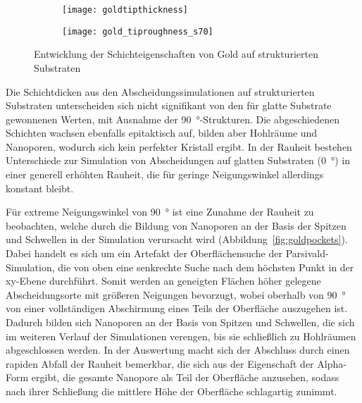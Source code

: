 \begin{figure}
  \captionsetup[subfigure]{singlelinecheck=false}
  \def\subfigwidth{0.49\textwidth}

  \begin{subfigure}[t]{\subfigwidth}
    \texttt{[image: goldtipthickness]}
    \label{fig:goldrough-a}
  \end{subfigure}
  \hfill
  \begin{subfigure}[t]{\subfigwidth}
    \texttt{[image: gold\_tiproughness\_s70]}
    \label{fig:goldrough-b}
  \end{subfigure}

  \caption[Schichteigenschaften von Gold auf strukturierten Substraten]{
    Entwicklung der Schichteigenschaften von Gold auf strukturierten Substraten
  }
  \label{fig:goldrough}

\end{figure}

Die Schichtdicken aus den Abscheidungssimulationen auf strukturierten Substraten unterscheiden sich nicht signifikant von den für glatte Substrate gewonnenen Werten, mit Ausnahme der \SI{90}{\degree}-Strukturen.
Die abgeschiedenen Schichten wachsen ebenfalls epitaktisch auf, bilden aber Hohlräume und Nanoporen, wodurch sich kein perfekter Kristall ergibt.
In der Rauheit bestehen Unterschiede zur Simulation von Abscheidungen auf glatten Substraten (\SI{0}{\degree}) in einer generell erhöhten Rauheit, die für geringe Neigungswinkel allerdings konstant bleibt.

Für extreme Neigungswinkel von \SI{90}{\degree} ist eine Zunahme der Rauheit zu beobachten, welche durch die Bildung von Nanoporen an der Basis der Spitzen und Schwellen in der Simulation verursacht wird (Abbildung~\ref{fig:goldpockets}).
Dabei handelt es sich um ein Artefakt der Oberflächensuche der Parsivald-Simulation, die von oben eine senkrechte Suche nach dem höchsten Punkt in der xy-Ebene durchführt.
Somit werden an geneigten Flächen höher gelegene Abscheidungsorte mit größeren Neigungen bevorzugt, wobei oberhalb von \SI{90}{\degree} von einer vollständigen Abschirmung eines Teils der Oberfläche auszugehen ist.
Dadurch bilden sich Nanoporen an der Basis von Spitzen und Schwellen, die sich im weiteren Verlauf der Simulationen verengen, bis sie schließlich zu Hohlräumen abgeschlossen werden.
In der Auswertung macht sich der Abschluss durch einen rapiden Abfall der Rauheit bemerkbar, die sich aus der Eigenschaft der Alpha-Form ergibt, die gesamte Nanopore als Teil der Oberfläche anzusehen, sodass nach ihrer Schließung die mittlere Höhe der Oberfläche schlagartig zunimmt.

